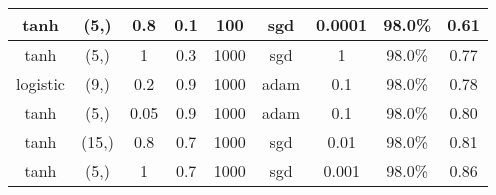 \begin{table}[]
\begin{tabular}{|c|c|c|c|c|c|c|c|c|}
tanh                & (5,)                                                                           & 0.8                                                                  & 0.1               & 100                                                                     & sgd             & 0.0001             & 98.0\%                                                               & 0.61                                                                                 \\ \hline
tanh                & (5,)                                                                           & 1                                                                    & 0.3               & 1000                                                                    & sgd             & 1                  & 98.0\%                                                               & 0.77                                                                                 \\ \hline
logistic            & (9,)                                                                           & 0.2                                                                  & 0.9               & 1000                                                                    & adam            & 0.1                & 98.0\%                                                               & 0.78                                                                                 \\ \hline
tanh                & (5,)                                                                           & 0.05                                                                 & 0.9               & 1000                                                                    & adam            & 0.1                & 98.0\%                                                               & 0.80                                                                                 \\ \hline
tanh                & (15,)                                                                          & 0.8                                                                  & 0.7               & 1000                                                                    & sgd             & 0.01               & 98.0\%                                                               & 0.81                                                                                 \\ \hline
tanh                & (5,)                                                                           & 1                                                                    & 0.7               & 1000                                                                    & sgd             & 0.001              & 98.0\%                                                               & 0.86                                                                                 \\ \hline

\end{tabular}
\end{table}
